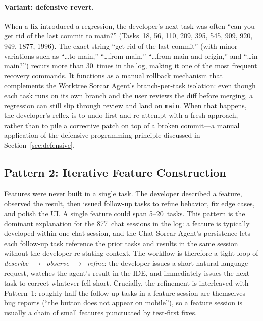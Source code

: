 \documentclass{article}
\begin{document}
\paragraph{Variant: defensive revert.}
When a fix introduced a regression, the developer's next task was
often ``can you get rid of the last commit to main?''
(Tasks~18, 56, 110, 209, 395, 545, 909, 920, 949, 1877, 1996).
The exact string ``get rid of the last commit'' (with minor
variations such as ``\ldots to main,'' ``\ldots from main,''
``\ldots from main and origin,'' and ``\ldots in main?'') recurs more
than 30~times in the log, making it one of the most frequent
recovery commands.
It functions as a manual rollback mechanism that complements the
Worktree Sorcar Agent's branch-per-task isolation: even though each
task runs on its own branch and the user reviews the diff before
merging, a regression can still slip through review and land on
\texttt{main}.
When that happens, the developer's reflex is to undo first and
re-attempt with a fresh approach, rather than to pile a corrective
patch on top of a broken commit---a manual application of the
defensive-programming principle discussed in
Section~\ref{sec:defensive}.

\subsection{Pattern 2: Iterative Feature Construction}
\label{sec:p-iterative}

Features were never built in a single task.
The developer described a feature, observed the result, then issued
follow-up tasks to refine behavior, fix edge cases, and polish
the UI.
A single feature could span 5--20~tasks.
This pattern is the dominant explanation for the 877~chat
sessions in the log: a feature is typically developed within one chat
session, and the Chat Sorcar Agent's persistence
lets each follow-up task reference the
prior tasks and results in the same session without the developer
re-stating context.
The workflow is therefore a tight loop of
\emph{describe~$\rightarrow$~observe~$\rightarrow$~refine}: the
developer issues a short natural-language request, watches the agent's
result in the IDE, and immediately issues the next task to correct
whatever fell short.
Crucially, the refinement is interleaved with Pattern~1: roughly half
the follow-up tasks in a feature session are themselves bug reports
(``the button does not appear on mobile''), so a feature session is
usually a chain of small features punctuated by test-first fixes.
\end{document}
